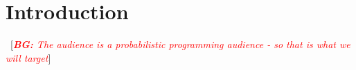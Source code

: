 \documentclass{article}
\newcommand{\bg}[1]{~{{[{\it \textcolor{red}{{\bf BG:} #1}}]}}}
\begin{document}
\begin{abstract}

\end{abstract}

\section{Introduction}
\label{sec:intro}
\bg{The audience is a probabilistic programming audience - so that is what we will target}


\end{document}
